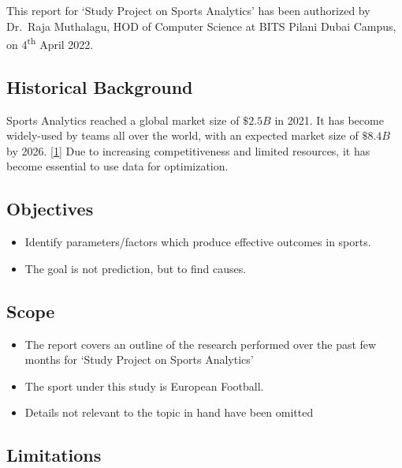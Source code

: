 \documentclass[
  english,
  doc,floatsintext]{apa6}
\providecommand{\tightlist}{%
  \setlength{\itemsep}{0pt}\setlength{\parskip}{0pt}}
\begin{document}
This report for `Study Project on Sports Analytics' has been authorized by Dr.~Raja Muthalagu, HOD of Computer Science at BITS Pilani Dubai Campus, on 4\textsuperscript{th} April 2022.

\hypertarget{historical-background}{%
\subsection{Historical Background}\label{historical-background}}

Sports Analytics reached a global market size of \(\$ 2.5B\) in 2021. It has become widely-used by teams all over the world, with an expected market size of \(\$ 8.4 B\) by 2026. \protect\hyperlink{ref-SportsAnalyticsMarket}{{[}1{]}} Due to increasing competitiveness and limited resources, it has become essential to use data for optimization.

\hypertarget{objectives}{%
\subsection{Objectives}\label{objectives}}

\begin{itemize}
\tightlist
\item
  Identify parameters/factors which produce effective outcomes in sports.
\item
  The goal is not prediction, but to find causes.
\end{itemize}

\hypertarget{scope}{%
\subsection{Scope}\label{scope}}

\begin{itemize}
\tightlist
\item
  The report covers an outline of the research performed over the past few months for `Study Project on Sports Analytics'
\item
  The sport under this study is European Football.
\item
  Details not relevant to the topic in hand have been omitted
\end{itemize}

\hypertarget{limitations}{%
\subsection{Limitations}\label{limitations}}
\end{document}
